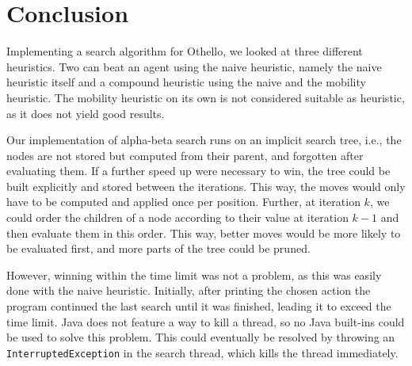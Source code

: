 \section{Conclusion}

Implementing a search algorithm for Othello, we looked at three different heuristics.
Two can beat an agent using the naive heuristic, namely the naive heuristic itself and a compound heuristic using the naive and the mobility heuristic.
The mobility heuristic on its own is not considered suitable as heuristic, as it does not yield good results.

Our implementation of alpha-beta search runs on an implicit search tree, i.e., the nodes are not stored but computed from their parent, and forgotten after evaluating them.
If a further speed up were necessary to win, the tree could be built explicitly and stored between the iterations.
This way, the moves would only have to be computed and applied once per position.
Further, at iteration $k$, we could order the children of a node according to their value at iteration $k-1$ and then evaluate them in this order.
This way, better moves would be more likely to be evaluated first, and more parts of the tree could be pruned.

However, winning within the time limit was not a problem, as this was easily done with the naive heuristic.
Initially, after printing the chosen action the program continued the last search until it was finished, leading it to exceed the time limit.
Java does not feature a way to kill a thread, so no Java built-ins could be used to solve this problem.
This could eventually be resolved by throwing an \texttt{InterruptedException} in the search thread, which kills the thread immediately.
